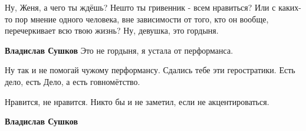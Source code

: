 \begin{itemize}
 

Ну, Женя, а чего ты ждёшь? Нешто ты гривенник - всем нравиться? Или с каких-то
пор мнение одного человека, вне зависимости от того, кто он вообще,
перечеркивает всю твою жизнь? Ну, девушка, это гордыня.

\begin{itemize}
 
\textbf{Владислав Сушков} Это не гордыня, я устала от перформанса.

 
Ну так и не помогай чужому перформансу. Сдались тебе эти геростратики. Есть дело, есть Дело, а есть говномётство.

 
Нравится, не нравится. Никто бы и не заметил, если не акцентироваться.

 
\textbf{Владислав Сушков} 


\end{itemize}
\end{itemize}
